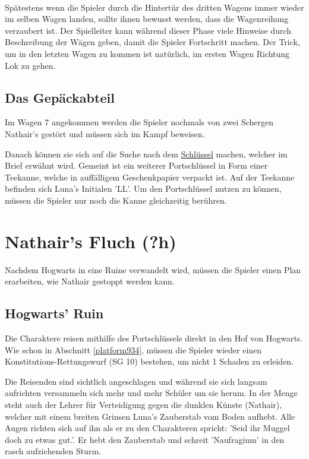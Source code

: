 \documentclass[]{scrartcl}
\begin{document}
~\\

Spätestens wenn die Spieler durch die Hintertür des dritten Wagens immer wieder im selben Wagen landen, sollte ihnen bewusst werden, dass die Wagenreihung verzaubert ist. Der Spielleiter kann während dieser Phase viele Hinweise durch Beschreibung der Wägen geben, damit die Spieler Fortschritt machen. Der Trick, um in den letzten Wagen zu kommen ist natürlich, im ersten Wagen Richtung Lok zu gehen.

\subsection{Das Gepäckabteil}

Im Wagen 7 angekommen werden die Spieler nochmals von zwei Schergen Nathair's gestört und müssen sich im Kampf beweisen.


Danach können sie sich auf die Suche nach dem \underline{Schlüssel} machen, welcher im Brief erwähnt wird. Gemeint ist ein weiterer Portschlüssel in Form einer Teekanne, welche in auffälligem Geschenkpapier verpackt ist. Auf der Teekanne befinden sich Luna's Initialen 'LL'. Um den Portschlüssel nutzen zu können, müssen die Spieler nur noch die Kanne gleichzeitig berühren.

\section{Nathair's Fluch (?h)}

Nachdem Hogwarts in eine Ruine verwandelt wird, müssen die Spieler einen Plan erarbeiten, wie Nathair gestoppt werden kann.

\subsection{Hogwarts' Ruin}

Die Charaktere reisen mithilfe des Portschlüssels direkt in den Hof von Hogwarts. Wie schon in Abschnitt \ref{platform934}, müssen die Spieler wieder einen Konstitutions-Rettungswurf (SG 10) bestehen, um nicht 1 Schaden zu erleiden.

Die Reisenden sind sichtlich angeschlagen und während sie sich langsam aufrichten versammeln sich mehr und mehr Schüler um sie herum. In der Menge steht auch der Lehrer für Verteidigung gegen die dunklen Künste (Nathair), welcher mit einem breiten Grinsen Luna's Zauberstab vom Boden aufhebt. Alle Augen richten sich auf ihn als er zu den Charakteren spricht: 'Seid ihr Muggel doch zu etwas gut.'. Er hebt den Zauberstab und schreit 'Naufragium' in den rasch aufziehenden Sturm.
\end{document}
